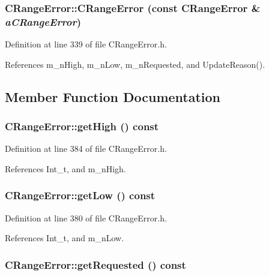 \subsubsection{\setlength{\rightskip}{0pt plus 5cm}CRange\-Error::CRange\-Error (const CRange\-Error \& {\em a\-CRange\-Error})\hspace{0.3cm}{\tt  [inline]}}\label{classCRangeError_a3}




Definition at line 339 of file CRange\-Error.h.

References m\_\-n\-High, m\_\-n\-Low, m\_\-n\-Requested, and Update\-Reason().

\subsection{Member Function Documentation}
\subsubsection{ CRange\-Error::get\-High () const\hspace{0.3cm}{\tt  [inline]}}\label{classCRangeError_a7}




Definition at line 384 of file CRange\-Error.h.

References Int\_\-t, and m\_\-n\-High.
\subsubsection{ CRange\-Error::get\-Low () const\hspace{0.3cm}{\tt  [inline]}}\label{classCRangeError_a6}




Definition at line 380 of file CRange\-Error.h.

References Int\_\-t, and m\_\-n\-Low.
\subsubsection{ CRange\-Error::get\-Requested () const\hspace{0.3cm}{\tt  [inline]}}\label{classCRangeError_a8}




